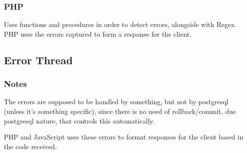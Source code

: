 \subsubsection[PHP]{PHP}
\begin{flushleft}
    Uses functions and procedures in order to detect errors, alongside with Regex.
    PHP uses the errors captured to form a response for the client.
\end{flushleft}

\subsection{Error Thread}\label{subsec:error-thread}
\subsubsection{Notes}\label{subsubsec:notes}
\begin{flushleft}
    The errors are supposed to be handled by something, but not by postgresql (unless it's something specific), since
    there is no need of rollback/commit, due postgresql nature, that controls this automatically.
\end{flushleft}
\begin{flushleft}
    PHP and JavaScript uses these errors to format responses for the client based in the code received.
\end{flushleft}


